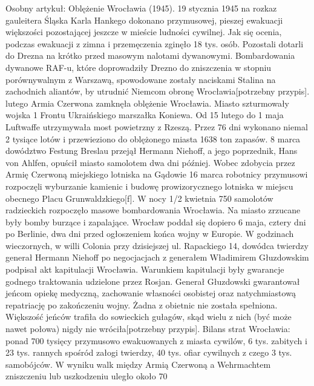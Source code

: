 \documentclass{article}
\begin{document}
\bigskip
\newline
 Osobny artykuł: Oblężenie Wrocławia (1945).
19 stycznia 1945 na rozkaz gauleitera Śląska Karla Hankego dokonano przymusowej, pieszej ewakuacji większości pozostającej jeszcze w mieście ludności cywilnej. Jak się ocenia, podczas ewakuacji z zimna i przemęczenia zginęło 18 tys. osób. Pozostali dotarli do Drezna na krótko przed masowym nalotami dywanowymi. Bombardowania dywanowe RAF-u, które doprowadziły Drezno do zniszczenia w stopniu porównywalnym z Warszawą, spowodowane zostały naciskami Stalina na zachodnich aliantów, by utrudnić Niemcom obronę Wrocławia[potrzebny przypis].
\bigskip
{} lutego Armia Czerwona zamknęła oblężenie Wrocławia. Miasto szturmowały wojska 1 Frontu Ukraińskiego marszałka Koniewa. Od 15 lutego do 1 maja Luftwaffe utrzymywała most powietrzny z Rzeszą. Przez 76 dni wykonano niemal 2 tysiące lotów i przewieziono do oblężonego miasta 1638 ton zapasów. 8 marca dowództwo Festung Breslau przejął Hermann Niehoff, a jego poprzednik, Hans von Ahlfen, opuścił miasto samolotem dwa dni później. Wobec zdobycia przez Armię Czerwoną miejskiego lotniska na Gądowie 16 marca robotnicy przymusowi rozpoczęli wyburzanie kamienic i budowę prowizorycznego lotniska w miejscu obecnego Placu Grunwaldzkiego[f]. W nocy 1/2 kwietnia 750 samolotów radzieckich rozpoczęło masowe bombardowania Wrocławia. Na miasto zrzucane były bomby burzące i zapalające.
\bigskip
\newline
Wrocław poddał się dopiero 6 maja, cztery dni po Berlinie, dwa dni przed ogłoszeniem końca wojny w Europie. W godzinach wieczornych, w willi Colonia przy dzisiejszej ul. Rapackiego 14, dowódca twierdzy generał Hermann Niehoff po negocjacjach z generałem Władimirem Głuzdowskim podpisał akt kapitulacji Wrocławia. Warunkiem kapitulacji były gwarancje godnego traktowania udzielone przez Rosjan. Generał Głuzdowski gwarantował jeńcom opiekę medyczną, zachowanie własności osobistej oraz natychmiastową repatriację po zakończeniu wojny. Żadna z obietnic nie została spełniona. Większość jeńców trafiła do sowieckich gułagów, skąd wielu z nich (być może nawet połowa) nigdy nie wróciła[potrzebny przypis].
\bigskip
\newline
Bilans strat Wrocławia: ponad 700 tysięcy przymusowo ewakuowanych z miasta cywilów, 6 tys. zabitych i 23 tys. rannych spośród załogi twierdzy, 40 tys. ofiar cywilnych z czego 3 tys. samobójców. W wyniku walk między Armią Czerwoną a Wehrmachtem zniszczeniu lub uszkodzeniu uległo około 70%
\end{document}

